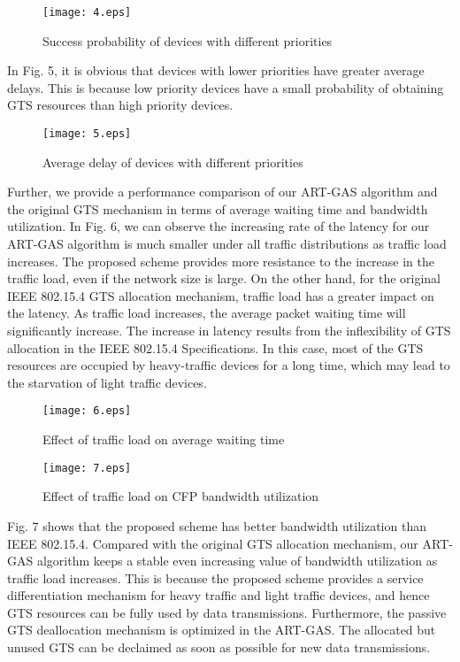 \documentclass[letterpaper]{sig-alternate-10pt}
\begin{document}
\begin{figure}[!t]
\renewcommand{\captionfont}{\bfseries}
\centering
\texttt{[image: 4.eps]}
\centering
\caption{Success probability of devices with different priorities}
\label{fig_sim}
\end{figure}

In Fig. 5, it is obvious that devices with lower priorities have greater average delays. This is because low priority devices have a small probability of obtaining GTS resources than high priority devices.

\begin{figure}[!t]
\renewcommand{\captionfont}{\bfseries}
\centering
\texttt{[image: 5.eps]}
\centering
\caption{Average delay of devices with different priorities}
\label{fig_sim}
\end{figure}

Further, we provide a performance comparison of our ART-GAS algorithm and the original GTS mechanism in terms of average waiting time and bandwidth utilization. In Fig. 6, we can observe the increasing rate of the latency for our ART-GAS algorithm is much smaller under all traffic distributions as traffic load increases. The proposed scheme provides more resistance to the increase in the traffic load, even if the network size is large. On the other hand, for the original IEEE 802.15.4 GTS allocation mechanism, traffic load has a greater impact on the latency. As traffic load increases, the average packet waiting time will significantly increase. The increase in latency results from the inflexibility of GTS allocation in the IEEE 802.15.4 Specifications. In this case, most of the GTS resources are occupied by heavy-traffic devices for a long time, which may lead to the starvation of light traffic devices.

\begin{figure}[!t]
\renewcommand{\captionfont}{\bfseries}
\centering
\texttt{[image: 6.eps]}
\centering
\caption{Effect of traffic load on average waiting time}
\label{fig_sim}
\end{figure}

\begin{figure}[!t]
\renewcommand{\captionfont}{\bfseries}
\centering
\texttt{[image: 7.eps]}
\centering
\caption{Effect of traffic load on CFP bandwidth utilization}
\label{fig_sim}
\end{figure}

Fig. 7 shows that the proposed scheme has better bandwidth utilization than IEEE 802.15.4. Compared with the original GTS allocation mechanism, our ART-GAS algorithm keeps a stable even increasing value of bandwidth utilization as traffic load increases. This is because the proposed scheme provides a service differentiation mechanism for heavy traffic and light traffic devices, and hence GTS resources can be fully used by data transmissions. Furthermore, the passive GTS deallocation mechanism is optimized in the ART-GAS. The allocated but unused GTS can be declaimed as soon as possible for new data transmissions.
\end{document}
